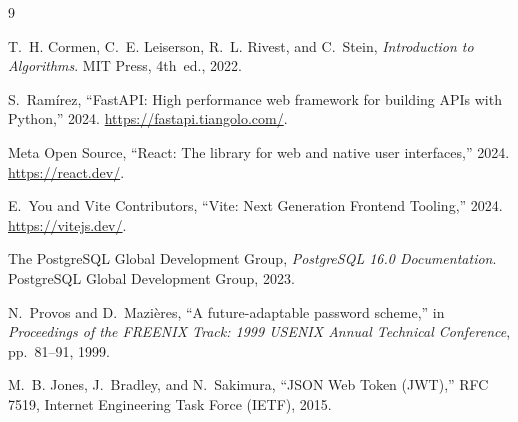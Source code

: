 \documentclass[11pt,a4paper]{article}
\begin{document}
\vspace{-0.25cm}
{\small
\begin{thebibliography}{9}
\setlength{\itemsep}{0pt}
\setlength{\parskip}{0pt}

T.~H. Cormen, C.~E. Leiserson, R.~L. Rivest, and C.~Stein, {\em Introduction to Algorithms}.
\newblock MIT Press, 4th~ed., 2022.

S.~Ram{\'i}rez, ``{FastAPI}: High performance web framework for building {APIs} with {Python},'' 2024.
\newblock \url{https://fastapi.tiangolo.com/}.

{Meta Open Source}, ``{React}: The library for web and native user interfaces,'' 2024.
\newblock \url{https://react.dev/}.

E.~You and {Vite Contributors}, ``{Vite}: Next Generation Frontend Tooling,'' 2024.
\newblock \url{https://vitejs.dev/}.

{The PostgreSQL Global Development Group}, {\em {PostgreSQL 16.0 Documentation}}.
\newblock PostgreSQL Global Development Group, 2023.

N.~Provos and D.~Mazi{\`e}res, ``A future-adaptable password scheme,'' in {\em Proceedings of the FREENIX Track: 1999 USENIX Annual Technical Conference}, pp.~81--91, 1999.

M.~B. Jones, J.~Bradley, and N.~Sakimura, ``{JSON Web Token (JWT)},'' RFC 7519, Internet Engineering Task Force (IETF), 2015.

\end{thebibliography}
}
\end{document}

